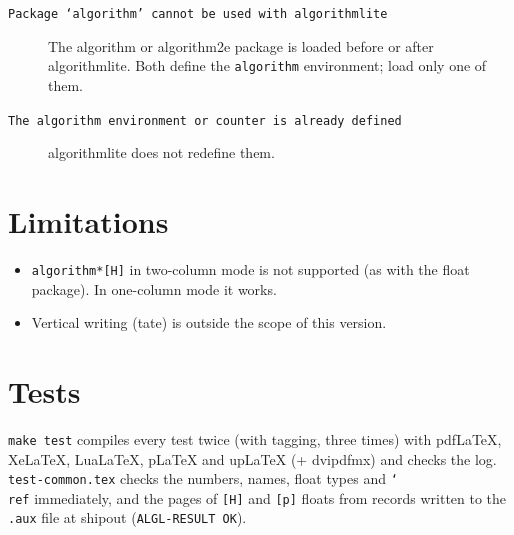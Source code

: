 \documentclass{article}
\newcommand*\cs[1]{\texttt{\char`\\#1}}
\newcommand*\pkg[1]{\textsf{#1}}
\newcommand*\env[1]{\texttt{#1}}
\begin{document}
\begin{description}
\item[\texttt{Package `algorithm' cannot be used with algorithmlite}]
  The \pkg{algorithm} or \pkg{algorithm2e} package is loaded before or
  after \pkg{algorithmlite}.  Both define the \env{algorithm}
  environment; load only one of them.
\item[\texttt{The algorithm environment or counter is already
  defined}] \pkg{algorithmlite} does not redefine them.
\end{description}

\section{Limitations}

\begin{itemize}
\item \texttt{algorithm*[H]} in two-column mode is not supported (as
  with the \pkg{float} package).  In one-column mode it works.
\item Vertical writing (tate) is outside the scope of this version.
\end{itemize}

\section{Tests}

\verb|make test| compiles every test twice (with tagging, three
times) with pdf\LaTeX, Xe\LaTeX, Lua\LaTeX, p\LaTeX{} and up\LaTeX{}
(+ dvipdfmx) and checks the log.
\texttt{test-common.tex} checks the numbers, names, float types and
\cs{ref} immediately, and the pages of \texttt{[H]} and \texttt{[p]}
floats from records written to the \texttt{.aux} file at shipout
(\texttt{ALGL-RESULT OK}).
\end{document}
